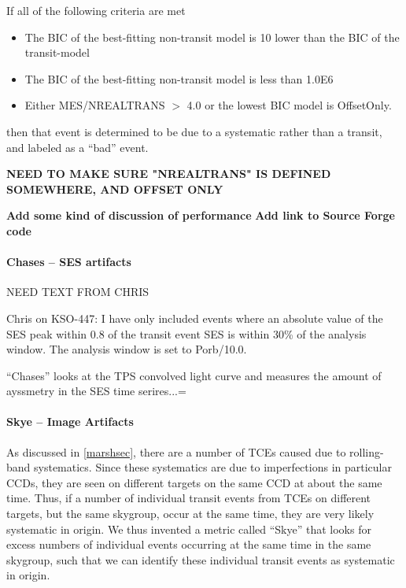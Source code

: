 
If all of the following criteria are met

\begin{itemize}
\item The BIC of the best-fitting non-transit model is 10 lower than the BIC of the transit-model
\item The BIC of the best-fitting non-transit model is less than 1.0E6
\item Either MES/NREALTRANS $>$ 4.0 or the lowest BIC model is OffsetOnly.
\end{itemize}

\noindent then that event is determined to be due to a systematic rather than a transit, and labeled as a ``bad'' event. 

{\bf NEED TO MAKE SURE "NREALTRANS" IS DEFINED SOMEWHERE, AND OFFSET ONLY}


{\bf Add some kind of discussion of performance}
{\bf Add link to Source Forge code}


\paragraph{Chases -- SES artifacts}

NEED TEXT FROM CHRIS

Chris on KSO-447: I have only included events where an absolute value of the SES peak within 0.8 of the transit event SES is within 30\% of the analysis window. The analysis window is set to Porb/10.0.

``Chases'' looks at the TPS convolved light curve and measures the amount of ayssmetry in the SES time serires...=



\paragraph{Skye -- Image Artifacts}

As discussed in \ref{marshsec}, there are a number of TCEs caused due to rolling-band systematics. Since these systematics are due to imperfections in particular CCDs, they are seen on different targets on the same CCD at about the same time. Thus, if a number of individual transit events from TCEs on different targets, but the same skygroup, occur at the same time, they are very likely systematic in origin. We thus invented a metric called ``Skye'' that looks for excess numbers of individual events occurring at the same time in the same skygroup, such that we can identify these individual transit events as systematic in origin.

